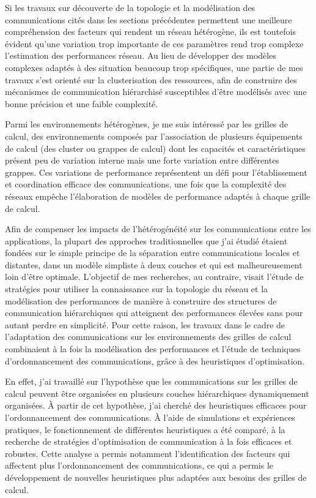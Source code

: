 \documentclass[a4paper]{book}
\begin{document}
Si les travaux sur découverte de la topologie et la modélisation des communications cités dans les sections précédentes permettent une meilleure compréhension des facteurs qui rendent un réseau hétérogène, ils est toutefois évident qu'une variation trop importante de ces paramètres rend trop complexe l'estimation des performances réseau. Au lieu de développer des modèles complexes adaptés à des situation beaucoup trop spécifiques, une partie de mes travaux s'est orienté sur la clusterisation des ressources, afin de construire des mécanismes de communication hiérarchisé susceptibles d'être modélisés avec une bonne précision et une faible complexité.   

Parmi les environnements hétérogènes, je me suis intéressé par les grilles de calcul, des environnements composés par l'association de plusieurs équipements de calcul (des cluster ou grappes de calcul) dont les capacités et caractéristiques présent peu de variation interne mais une forte variation entre différentes grappes.  Ces variations de performance représentent un défi pour l'établissement et coordination efficace des communications, une fois que la complexité des réseaux empêche l'élaboration de modèles de performance adaptés à chaque grille de calcul. 

Afin de compenser les impacts de l'hétérogénéité sur les communications entre les applications, la plupart des approches traditionnelles que j'ai étudié étaient fondées sur le simple principe de la séparation entre communications locales et distantes, dans un modèle simpliste à deux couches et qui est malheureusement loin d'être optimale. L'objectif de mes recherches, au contraire, visait l'étude de stratégies pour utiliser la connaissance sur la topologie du réseau et la modélisation des performances de manière à construire des structures de communication hiérarchiques qui atteignent des performances élevées sans pour autant perdre en simplicité. Pour cette raison, les travaux dans le cadre de l'adaptation des communications sur les environnements des grilles de calcul combinaient à la fois la modélisation des performances et l'étude de techniques d'ordonnancement des communications, grâce à des heuristiques d'optimisation.

 En effet, j'ai travaillé sur l'hypothèse que les communications sur les grilles de calcul peuvent être organisées en plusieurs couches hiérarchiques dynamiquement organisées. À partir de cet hypothèse, j'ai cherché des heuristiques efficaces pour l'ordonnancement des communications. À l'aide de simulations et expériences pratiques, le fonctionnement de différentes heuristiques a été comparé, à la recherche de stratégies d'optimisation de communication à la fois efficaces et robustes. Cette analyse a permis notamment l'identification des facteurs qui affectent plus l'ordonnancement des communications, ce qui a permis le développement de nouvelles heuristiques plus adaptées aux besoins des grilles de calcul.
\end{document}

